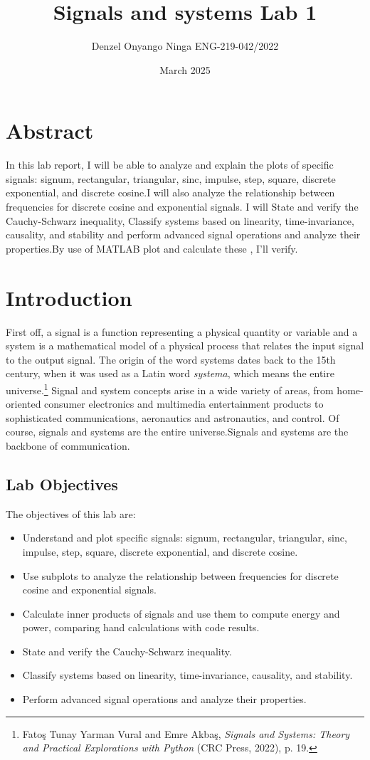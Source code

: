 \documentclass[12pt]{article}
\title{Signals and systems Lab 1}
\author{Denzel Onyango Ninga
ENG-219-042/2022}
\date{March 2025}
\begin{document}
\maketitle

\section{Abstract}
In this lab report, I will be able to analyze and explain the plots of specific signals: signum, rectangular, triangular, sinc, impulse,
step, square, discrete exponential, and discrete cosine.I will also analyze the relationship between frequencies for discrete cosine and exponential signals. I will State and verify the Cauchy-Schwarz inequality, Classify systems based on linearity, time-invariance, causality, and stability and perform advanced signal operations and analyze their properties.By use of MATLAB plot and calculate these , I'll verify.
\section{Introduction}
First off, a signal is a function representing a physical quantity or variable and a system is a mathematical model of a physical process that relates the input signal to the output signal. 
The origin of the word systems dates back to the 15th century, 
when it was used as a Latin word \textit{systema}, 
which means the entire universe.\footnote{Fatoş Tunay Yarman Vural and Emre Akbaş, 
\textit{Signals and Systems: Theory and Practical Explorations with Python} 
(CRC Press, 2022), p. 19.}
Signal and system concepts arise in a wide variety of areas, from home-oriented consumer electronics and multimedia entertainment products to sophisticated communications, aeronautics and astronautics, and control. Of course, signals and systems are the entire universe.Signals and systems are the backbone of communication.
\subsection{Lab Objectives}
The objectives of this lab are:
\begin{itemize}
    \item Understand and plot specific signals: signum, rectangular, triangular, sinc, impulse, step, square, discrete exponential, and discrete cosine.
    \item Use subplots to analyze the relationship between frequencies for discrete cosine and exponential signals.
    \item Calculate inner products of signals and use them to compute energy and power, comparing hand calculations with code results.
    \item State and verify the Cauchy-Schwarz inequality.
    \item Classify systems based on linearity, time-invariance, causality, and stability.
    \item Perform advanced signal operations and analyze their properties.
\end{itemize}
\end{document}
